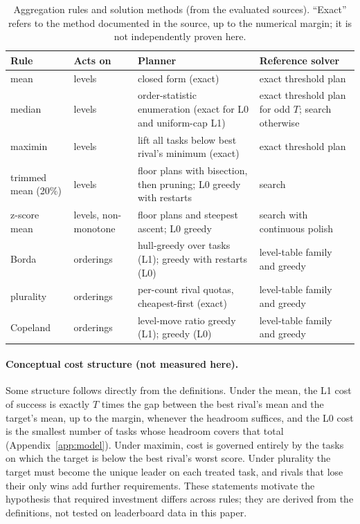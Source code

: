 \documentclass{article}
\begin{document}
\begin{table}[t]
\centering
\caption{Aggregation rules and solution methods (from the evaluated sources). ``Exact'' refers to the method documented in the source, up to the numerical margin; it is not independently proven here.}
\label{tab:rules}
\small
\begin{tabular}{@{}p{2.3cm}p{1.7cm}p{3.25cm}p{3.0cm}@{}}
\toprule
Rule & Acts on & Planner & Reference solver\\
\midrule
mean & levels & closed form (exact) & exact threshold plan\\
median & levels & order-statistic enumeration (exact for L0 and uniform-cap L1) & exact threshold plan for odd $T$; search otherwise\\
maximin & levels & lift all tasks below best rival's minimum (exact) & exact threshold plan\\
trimmed mean (20\%) & levels & floor plans with bisection, then pruning; L0 greedy with restarts & search\\
z-score mean & levels, non-monotone & floor plans and steepest ascent; L0 greedy & search with continuous polish\\
Borda & orderings & hull-greedy over tasks (L1); greedy with restarts (L0) & level-table family and greedy\\
plurality & orderings & per-count rival quotas, cheapest-first (exact) & level-table family and greedy\\
Copeland & orderings & level-move ratio greedy (L1); greedy (L0) & level-table family and greedy\\
\bottomrule
\end{tabular}
\end{table}

\paragraph{Conceptual cost structure (not measured here).} Some structure follows directly from the definitions. Under the mean, the L1 cost of success is exactly $T$ times the gap between the best rival's mean and the target's mean, up to the margin, whenever the headroom suffices, and the L0 cost is the smallest number of tasks whose headroom covers that total (Appendix~\ref{app:model}). Under maximin, cost is governed entirely by the tasks on which the target is below the best rival's worst score. Under plurality the target must become the unique leader on each treated task, and rivals that lose their only wins add further requirements. These statements motivate the hypothesis that required investment differs across rules; they are derived from the definitions, not tested on leaderboard data in this paper.
\end{document}
